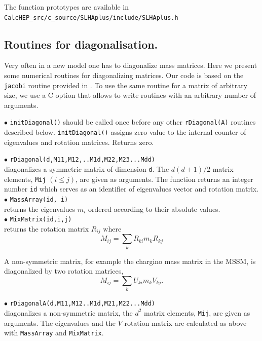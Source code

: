 \documentclass[12pt,a4paper]{article}
\begin{document}
The  function prototypes are available  in \\
\verb|CalcHEP_src/c_source/SLHAplus/include/SLHAplus.h|

\subsection{Routines for diagonalisation.}

Very often in a new model  one has to diagonalize 
mass matrices. Here we present some numerical routines for 
diagonalizing matrices. Our code is based on the \verb|jacobi| routine provided in 
 \cite{Numerical}. To use the same routine for a matrix of arbitrary size, we 
use a C option that allows to write routines with an arbitrary number of arguments. 

\noindent 
$\bullet$ \verb|initDiagonal()| should be called once  before any other 
\verb|rDiagonal(A)| routines described below. \verb|initDiagonal()| assigns zero value 
to the internal counter of  eigenvalues and rotation matrices. Returns zero.

\noindent
$\bullet$ \verb|rDiagonal(d,M11,M12,..M1d,M22,M23...Mdd)|\\
diagonalizes a symmetric matrix of dimension \verb|d|. The  
$d(d+1)/2$  matrix elements, \verb|Mij| $(i\le j)$, are given as arguments.
The function returns an integer number \verb|id| which serves as an  identifier 
of eigenvalues vector and rotation matrix.\\
\noindent
$\bullet$ \verb|MassArray(id, i)|\\ returns the eigenvalues  $m_i$ ordered according to 
their absolute values. \\
\noindent
$\bullet$ \verb|MixMatrix(id,i,j)|\\ returns the rotation matrix  $R_{ij}$ where
$$  M_{ij} = \sum\limits_k  R_{ki} m_k R_{kj}$$

A non-symmetric matrix, for example the 
chargino mass matrix in the  MSSM, is diagonalized by  two rotation matrices,
$$  M_{ij} = \sum\limits_k  U_{ki} m_k V_{kj}.$$ 

\noindent
$\bullet$ \verb|rDiagonalA(d,M11,M12..M1d,M21,M22...Mdd)|\\ 
diagonalizes a non-symmetric matrix, the $d^2$  matrix elements, \verb|Mij|, are given as arguments.
The eigenvalues and the $V$ rotation matrix are calculated as above with 
\verb|MassArray| and \verb|MixMatrix|. 
\end{document}
